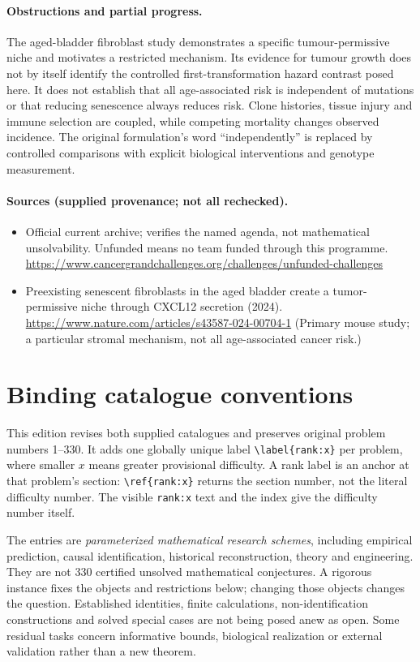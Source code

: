 \documentclass[11pt]{article}
\begin{document}
\paragraph{Obstructions and partial progress.} The aged-bladder fibroblast study demonstrates a specific tumour-permissive niche and motivates a restricted mechanism. Its evidence for tumour growth does not by itself identify the controlled first-transformation hazard contrast posed here. It does not establish that all age-associated risk is independent of mutations or that reducing senescence always reduces risk. Clone histories, tissue injury and immune selection are coupled, while competing mortality changes observed incidence. The original formulation's word ``independently'' is replaced by controlled comparisons with explicit biological interventions and genotype measurement.

\paragraph{Sources (supplied provenance; not all rechecked).} \begin{itemize}
\item Official current archive; verifies the named agenda, not mathematical unsolvability. Unfunded means no team funded through this programme. \url{https://www.cancergrandchallenges.org/challenges/unfunded-challenges}
\item Preexisting senescent fibroblasts in the aged bladder create a tumor-permissive niche through CXCL12 secretion (2024). \url{https://www.nature.com/articles/s43587-024-00704-1} (Primary mouse study; a particular stromal mechanism, not all age-associated cancer risk.)
\end{itemize}


\section*{Binding catalogue conventions}
This edition revises both supplied catalogues and preserves original problem numbers 1--330. It adds one globally unique label \verb|\label{rank:x}| per problem, where smaller $x$ means greater provisional difficulty. A rank label is an anchor at that problem's section: \verb|\ref{rank:x}| returns the section number, not the literal difficulty number. The visible \texttt{rank:x} text and the index give the difficulty number itself.

The entries are \emph{parameterized mathematical research schemes}, including empirical prediction, causal identification, historical reconstruction, theory and engineering. They are not 330 certified unsolved mathematical conjectures. A rigorous instance fixes the objects and restrictions below; changing those objects changes the question. Established identities, finite calculations, non-identification constructions and solved special cases are not being posed anew as open. Some residual tasks concern informative bounds, biological realization or external validation rather than a new theorem.
\end{document}
